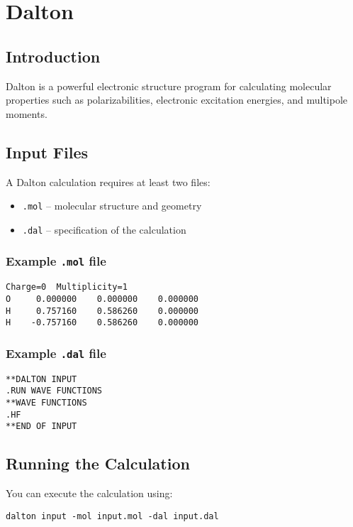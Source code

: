 \chapter{Dalton}

\section{Introduction}

Dalton is a powerful electronic structure program for calculating molecular properties such as polarizabilities, electronic excitation energies, and multipole moments.

\section{Input Files}

A Dalton calculation requires at least two files:
\begin{itemize}
    \item \texttt{.mol} – molecular structure and geometry
    \item \texttt{.dal} – specification of the calculation
\end{itemize}

\subsection*{Example \texttt{.mol} file}

\begin{verbatim}
Charge=0  Multiplicity=1
O     0.000000    0.000000    0.000000
H     0.757160    0.586260    0.000000
H    -0.757160    0.586260    0.000000
\end{verbatim}

\subsection*{Example \texttt{.dal} file}

\begin{verbatim}
**DALTON INPUT
.RUN WAVE FUNCTIONS
**WAVE FUNCTIONS
.HF
**END OF INPUT
\end{verbatim}

\section{Running the Calculation}

You can execute the calculation using:

\begin{verbatim}
dalton input -mol input.mol -dal input.dal
\end{verbatim}

